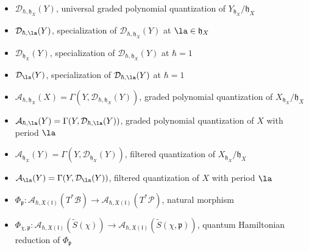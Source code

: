 \documentclass[12pt]{amsart}
\begin{document}
\begin{itemize}
        \item $\mathcal{D}_{\hbar,\mathfrak{h}_X}(Y)$, universal graded polynomial quantization of $Y_{\mathfrak{h}_X}/\mathfrak{h}_X$
        \item $\mathcal{D}_{\hbar,\la}(Y)$, specialization of $\mathcal{D}_{\hbar,\mathfrak{h}_X}(Y)$ at $\la \in \mathfrak{h}_X$
         \item $\mathcal{D}_{\mathfrak{h}_X}(Y)$, specialization of $\mathcal{D}_{\hbar,\mathfrak{h}_X}(Y)$ at $\hbar=1$
        \item $\mathcal{D}_{\la}(Y)$, specialization of $\mathcal{D}_{\hbar,\la}(Y)$ at $\hbar=1$
        \item $\mathcal{A}_{\hbar,\mathfrak{h}_X}(X)=\Gamma(Y,\mathcal{D}_{\hbar,\mathfrak{h}_X}(Y))$,  graded polynomial quantization of $X_{\mathfrak{h}_X}/\mathfrak{h}_X$
        \item $\mathcal{A}_{\hbar,\la}(Y)=\Gamma(Y,\mathcal{D}_{\hbar,\la}(Y))$, graded polynomial quantization of $X$ with period $\la$
        \item $\mathcal{A}_{\mathfrak{h}_X}(Y)=\Gamma(Y,\mathcal{D}_{\mathfrak{h}_X}(Y))$, filtered quantization of $X_{\mathfrak{h}_X}/\mathfrak{h}_X$
        \item $\mathcal{A}_{\la}(Y)=\Gamma(Y,\mathcal{D}_{\la}(Y))$, filtered quantization of $X$ with period $\la$
         \item $\Phi_{\mathfrak{p}}\colon \mathcal{A}_{\hbar,\mathfrak{X}(\mathfrak{l})}(T^*\mathcal{B}) \rightarrow \mathcal{A}_{\hbar,\mathfrak{X}(\mathfrak{l})}(T^*\mathcal{P})$, natural morphism 
         \item $\Phi_{\chi,\mathfrak{p}}\colon \mathcal{A}_{\hbar,\mathfrak{X}(\mathfrak{l})}(\widetilde{S}(\chi)) \rightarrow \mathcal{A}_{\hbar,\mathfrak{X}(\mathfrak{l})}(\widetilde{S}(\chi,\mathfrak{p}))$, quantum Hamiltonian reduction of $\Phi_{\mathfrak{p}}$
   \end{itemize}





\begin{sloppypar} \printbibliography[title={References}] \end{sloppypar}
\end{document}

